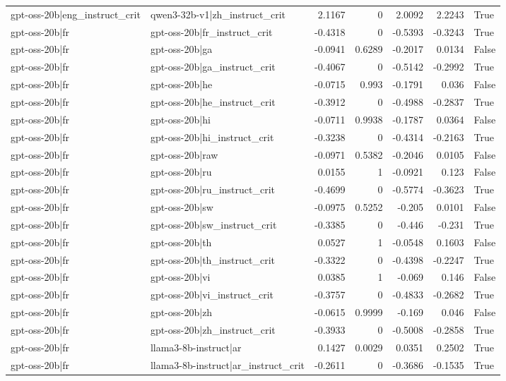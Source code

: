 \begin{table}
\begin{tabular}{l l r r r r l}
gpt-oss-20b|eng_instruct_crit & qwen3-32b-v1|zh_instruct_crit & 2.1167 & 0 & 2.0092 & 2.2243 & True \\
gpt-oss-20b|fr & gpt-oss-20b|fr_instruct_crit & -0.4318 & 0 & -0.5393 & -0.3243 & True \\
gpt-oss-20b|fr & gpt-oss-20b|ga & -0.0941 & 0.6289 & -0.2017 & 0.0134 & False \\
gpt-oss-20b|fr & gpt-oss-20b|ga_instruct_crit & -0.4067 & 0 & -0.5142 & -0.2992 & True \\
gpt-oss-20b|fr & gpt-oss-20b|he & -0.0715 & 0.993 & -0.1791 & 0.036 & False \\
gpt-oss-20b|fr & gpt-oss-20b|he_instruct_crit & -0.3912 & 0 & -0.4988 & -0.2837 & True \\
gpt-oss-20b|fr & gpt-oss-20b|hi & -0.0711 & 0.9938 & -0.1787 & 0.0364 & False \\
gpt-oss-20b|fr & gpt-oss-20b|hi_instruct_crit & -0.3238 & 0 & -0.4314 & -0.2163 & True \\
gpt-oss-20b|fr & gpt-oss-20b|raw & -0.0971 & 0.5382 & -0.2046 & 0.0105 & False \\
gpt-oss-20b|fr & gpt-oss-20b|ru & 0.0155 & 1 & -0.0921 & 0.123 & False \\
gpt-oss-20b|fr & gpt-oss-20b|ru_instruct_crit & -0.4699 & 0 & -0.5774 & -0.3623 & True \\
gpt-oss-20b|fr & gpt-oss-20b|sw & -0.0975 & 0.5252 & -0.205 & 0.0101 & False \\
gpt-oss-20b|fr & gpt-oss-20b|sw_instruct_crit & -0.3385 & 0 & -0.446 & -0.231 & True \\
gpt-oss-20b|fr & gpt-oss-20b|th & 0.0527 & 1 & -0.0548 & 0.1603 & False \\
gpt-oss-20b|fr & gpt-oss-20b|th_instruct_crit & -0.3322 & 0 & -0.4398 & -0.2247 & True \\
gpt-oss-20b|fr & gpt-oss-20b|vi & 0.0385 & 1 & -0.069 & 0.146 & False \\
gpt-oss-20b|fr & gpt-oss-20b|vi_instruct_crit & -0.3757 & 0 & -0.4833 & -0.2682 & True \\
gpt-oss-20b|fr & gpt-oss-20b|zh & -0.0615 & 0.9999 & -0.169 & 0.046 & False \\
gpt-oss-20b|fr & gpt-oss-20b|zh_instruct_crit & -0.3933 & 0 & -0.5008 & -0.2858 & True \\
gpt-oss-20b|fr & llama3-8b-instruct|ar & 0.1427 & 0.0029 & 0.0351 & 0.2502 & True \\
gpt-oss-20b|fr & llama3-8b-instruct|ar_instruct_crit & -0.2611 & 0 & -0.3686 & -0.1535 & True \\

\end{tabular}
\end{table}
